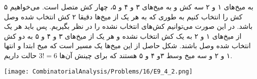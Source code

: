 به میخ‌های ۱ و ۲ سه کش و به میخ‌های ۳ و ۴ و ۵، چهار کش متصل است. می‌خواهیم ۵ کش را انتخاب کنیم به طوری که به هر یک از میخ‌ها دقیقا ۲ کش انتخاب شده وصل باشد. در این صورت می‌توانیم کش‌های انتخاب نشده را در نظر بگیریم. 
پس باید هر یک از میخ‌های ۱ و ۲ به یک کش انتخاب نشده و هر یک از میخ‌های ۳ و ۴ و ۵ به دو کش انتخاب شده وصل باشند.
شکل حاصل از این میخ‌ها یک مسیر است که میخ ابتدا و انتها ۱ و ۲ و سه میخ وسط ۳و ۴ و ۵ هستند که برای چینش آن‌ها
$3! = 6$
حالت داریم.
\begin{center}
  \texttt{[image: CombinatorialAnalysis/Problems/16/E9\_4\_2.png]}
\end{center}